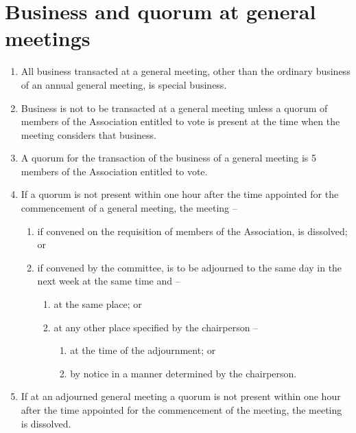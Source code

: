 \documentclass[a4paper,11pt]{article}
\begin{document}
\section{Business and quorum at general meetings}
\begin{enumerate}
	\item All business transacted at a general meeting, other than the ordinary business of an annual general meeting, is special business.
	\item Business is not to be transacted at a general meeting unless a quorum of members of the Association entitled to vote is present at the time when the meeting considers that business.
	\item A quorum for the transaction of the business of a general meeting is 5 members of the Association entitled to vote.
	
	\item If a quorum is not present within one hour after the time appointed for the commencement of a general meeting, the meeting --
	\begin{enumerate}
		\item if convened on the requisition of members of the Association, is dissolved; or

		\item if convened by the committee, is to be adjourned to the same day in the next week at the same time and --
		\begin{enumerate}
			\item at the same place; or
			
			\item at any other place specified by the chairperson --
			\begin{enumerate}
				\item at the time of the adjournment; or
				\item by notice in a manner determined by the chairperson.
			\end{enumerate}
		\end{enumerate}
	\end{enumerate}
	
	\item If at an adjourned general meeting a quorum is not present within one hour after the time appointed for the commencement of the meeting, the meeting is dissolved.
\end{enumerate}
\end{document}
